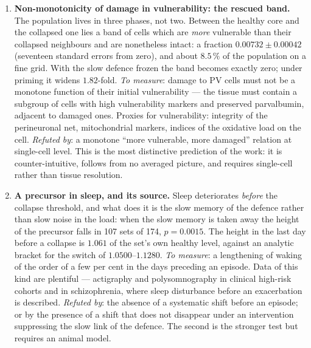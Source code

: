 \begin{enumerate}[leftmargin=1.5em,itemsep=4pt]
\item \textbf{Non-monotonicity of damage in vulnerability: the rescued band.} The population lives in three phases, not two. Between the healthy core and the collapsed one lies a band of cells which are \emph{more} vulnerable than their collapsed neighbours and are nonetheless intact: a fraction $0.00732\pm0.00042$ (seventeen standard errors from zero), and about $8.5\,\%$ of the population on a fine grid. With the slow defence frozen the band becomes exactly zero; under priming it widens $1.82$-fold. \emph{To measure}: damage to PV cells must not be a monotone function of their initial vulnerability --- the tissue must contain a subgroup of cells with high vulnerability markers and preserved parvalbumin, adjacent to damaged ones. Proxies for vulnerability: integrity of the perineuronal net, mitochondrial markers, indices of the oxidative load on the cell. \emph{Refuted by}: a monotone ``more vulnerable, more damaged'' relation at single-cell level. This is the most distinctive prediction of the work: it is counter-intuitive, follows from no averaged picture, and requires single-cell rather than tissue resolution.

\item \textbf{A precursor in sleep, and its source.} Sleep deteriorates \emph{before} the collapse threshold, and what does it is the slow memory of the defence rather than slow noise in the load: when the slow memory is taken away the height of the precursor falls in 107 sets of 174, $p=0.0015$. The height in the last day before a collapse is $1.061$ of the set's own healthy level, against an analytic bracket for the switch of $1.0500$--$1.1280$. \emph{To measure}: a lengthening of waking of the order of a few per cent in the days preceding an episode. Data of this kind are plentiful --- actigraphy and polysomnography in clinical high-risk cohorts and in schizophrenia, where sleep disturbance before an exacerbation is described. \emph{Refuted by}: the absence of a systematic shift before an episode; or by the presence of a shift that does not disappear under an intervention suppressing the slow link of the defence. The second is the stronger test but requires an animal model.


\end{enumerate}
